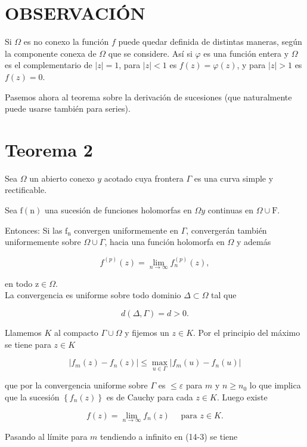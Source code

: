 \documentclass[10pt]{article}
\theoremstyle{plain}
\theoremstyle{definition}
\theoremstyle{remark}
\begin{document}
\section*{OBSERVACIÓN}
Si $\Omega$ es no conexo la función $f$ puede quedar definida de distintas maneras, según la componente conexa de $\Omega$ que se considere. Así si $\varphi$ es una función entera y $\Omega$ es el complementario de $|z|=1$, para $|z|<1$ es $f(z)=\varphi(z)$, y para $|z|>1$ es $f(z)=0$.

Pasemos ahora al teorema sobre la derivación de sucesiones (que naturalmente puede usarse también para series).

\section*{Teorema 2}
Sea $\Omega$ un abierto conexo $y$ acotado cuya frontera $\Gamma$ es una curva simple y rectificable.

Sea $\mathrm{f}(\mathrm{n})$ una sucesión de funciones holomorfas en $\Omega y$ continuas en $\Omega \cup \mathrm{F}$.

Entonces: Si las $\mathrm{f}_{\mathrm{n}}$ convergen uniformemente en $\Gamma$, convergerán también uniformemente sobre $\Omega \cup \Gamma$, hacia una función holomorfa en $\Omega$ y además

$$
f^{(p)}(z)=\lim _{n \rightarrow \infty} f_{n}^{(p)}(z),
$$

en todo $\mathrm{z} \in \Omega$.\\
La convergencia es uniforme sobre todo dominio $\Delta \subset \Omega$ tal que

$$
d(\Delta, \Gamma)=d>0 .
$$

Llamemos $K$ al compacto $\Gamma \cup \Omega$ y fijemos un $z \in K$. Por el principio del máximo se tiene para $z \in K$


\begin{equation*}
\left|f_{m}(z)-f_{n}(z)\right| \leqslant \max _{u \in \Gamma}\left|f_{m}(u)-f_{n}(u)\right| \tag{14-3}
\end{equation*}


que por la convergencia uniforme sobre $\Gamma$ es $\leqslant \varepsilon$ para $m$ y $n \geqslant n_{0}$ lo que implica que la sucesión $\left\{f_{n}(z)\right\}$ es de Cauchy para cada $z \in K$. Luego existe

$$
f(z)=\lim _{n \rightarrow \infty} f_{n}(z) \quad \text { para } z \in K .
$$

Pasando al límite para $m$ tendiendo a infinito en (14-3) se tiene
\end{document}
